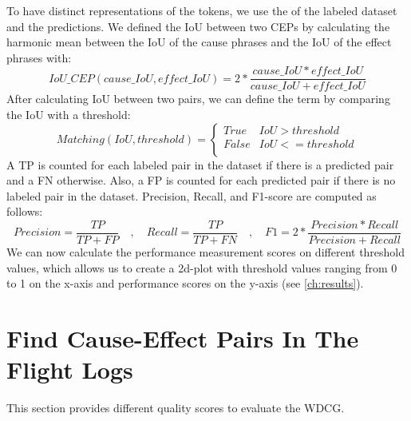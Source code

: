 To have distinct representations of the tokens, we use the  of the labeled dataset and the predictions.
We defined the \ac{IoU} between two \ac{CEP}s by calculating the harmonic mean between the \ac{IoU}  of the cause phrases and the \ac{IoU} of the effect phrases with:
\begin{equation}
    \label{eq:iuo-cause-effect-pair}
    IoU\_CEP(cause\_IoU, effect\_IoU) = 2*\frac{cause\_IoU*effect\_IoU}{cause\_IoU+effect\_IoU}
\end{equation}
After calculating \ac{IoU} between two pairs, we can define the  term by comparing the \ac{IoU}  with a threshold:
\begin{equation}
    \label{eq:matching}
    Matching(IoU, threshold) = \left\{
    \begin{array}{ll}
        True  & IoU > threshold  \\
        False & IoU <= threshold \\
    \end{array}
    \right.
\end{equation}
A \ac{TP} is counted for each labeled pair in the dataset if there is a  predicted pair and a \ac{FN} otherwise.
Also, a \ac{FP} is counted for each predicted pair if there is no  labeled pair in the dataset.
Precision, Recall, and F1-score are computed as follows:
\begin{equation}
    \label{eq:measurement-scores}
    Precision = \frac{TP}{TP+FP}
    \quad\mathrm{,}\quad
    Recall = \frac{TP}{TP+FN}
    \quad\mathrm{,}\quad
    F1 = 2*\frac{Precision*Recall}{Precision+Recall}
\end{equation}
We can now calculate the performance measurement scores on different threshold values, which allows us to create a 2d-plot with threshold values ranging from 0 to 1 on the x-axis and performance scores on the y-axis (see \autoref{ch:results}).


\section{Find Cause-Effect Pairs In The Flight Logs}\label{sec:find-cause-effect-pairs-in-the-uav-logs}
This section provides different quality scores to evaluate the \ac{WDCG}.

